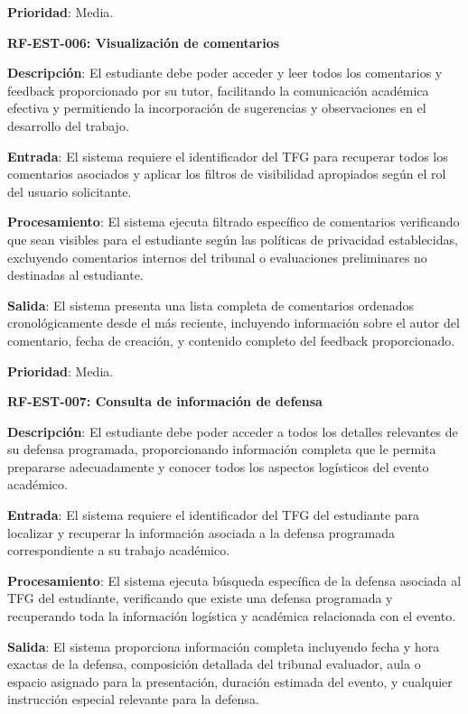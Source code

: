\documentclass[12pt,a4paper,oneside]{report}
\begin{document}
\textbf{Prioridad}: Media.

\textbf{RF-EST-006: Visualización de comentarios}

\textbf{Descripción}: El estudiante debe poder acceder y leer todos los comentarios y feedback proporcionado por su tutor, facilitando la comunicación académica efectiva y permitiendo la incorporación de sugerencias y observaciones en el desarrollo del trabajo.

\textbf{Entrada}: El sistema requiere el identificador del TFG para recuperar todos los comentarios asociados y aplicar los filtros de visibilidad apropiados según el rol del usuario solicitante.

\textbf{Procesamiento}: El sistema ejecuta filtrado específico de comentarios verificando que sean visibles para el estudiante según las políticas de privacidad establecidas, excluyendo comentarios internos del tribunal o evaluaciones preliminares no destinadas al estudiante.

\textbf{Salida}: El sistema presenta una lista completa de comentarios ordenados cronológicamente desde el más reciente, incluyendo información sobre el autor del comentario, fecha de creación, y contenido completo del feedback proporcionado.

\textbf{Prioridad}: Media.

\textbf{RF-EST-007: Consulta de información de defensa}

\textbf{Descripción}: El estudiante debe poder acceder a todos los detalles relevantes de su defensa programada, proporcionando información completa que le permita prepararse adecuadamente y conocer todos los aspectos logísticos del evento académico.

\textbf{Entrada}: El sistema requiere el identificador del TFG del estudiante para localizar y recuperar la información asociada a la defensa programada correspondiente a su trabajo académico.

\textbf{Procesamiento}: El sistema ejecuta búsqueda específica de la defensa asociada al TFG del estudiante, verificando que existe una defensa programada y recuperando toda la información logística y académica relacionada con el evento.

\textbf{Salida}: El sistema proporciona información completa incluyendo fecha y hora exactas de la defensa, composición detallada del tribunal evaluador, aula o espacio asignado para la presentación, duración estimada del evento, y cualquier instrucción especial relevante para la defensa.
\end{document}
